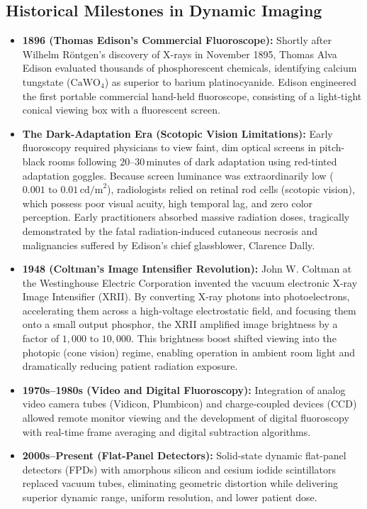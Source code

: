 \documentclass[11pt,a4paper]{article}
\begin{document}
\subsection{Historical Milestones in Dynamic Imaging}

\begin{itemize}[leftmargin=*]
    \item \textbf{1896 (Thomas Edison's Commercial Fluoroscope):} Shortly after Wilhelm Röntgen's discovery of X-rays in November 1895, Thomas Alva Edison evaluated thousands of phosphorescent chemicals, identifying calcium tungstate ($\text{CaWO}_4$) as superior to barium platinocyanide. Edison engineered the first portable commercial hand-held fluoroscope, consisting of a light-tight conical viewing box with a fluorescent screen.
    \item \textbf{The Dark-Adaptation Era (Scotopic Vision Limitations):} Early fluoroscopy required physicians to view faint, dim optical screens in pitch-black rooms following $20\text{--}30\,\text{minutes}$ of dark adaptation using red-tinted adaptation goggles. Because screen luminance was extraordinarily low ($0.001\text{ to }0.01\,\text{cd/m}^2$), radiologists relied on retinal rod cells (scotopic vision), which possess poor visual acuity, high temporal lag, and zero color perception. Early practitioners absorbed massive radiation doses, tragically demonstrated by the fatal radiation-induced cutaneous necrosis and malignancies suffered by Edison's chief glassblower, Clarence Dally.
    \item \textbf{1948 (Coltman's Image Intensifier Revolution):} John W. Coltman at the Westinghouse Electric Corporation invented the vacuum electronic X-ray Image Intensifier (XRII). By converting X-ray photons into photoelectrons, accelerating them across a high-voltage electrostatic field, and focusing them onto a small output phosphor, the XRII amplified image brightness by a factor of $1,000\text{ to }10,000$. This brightness boost shifted viewing into the photopic (cone vision) regime, enabling operation in ambient room light and dramatically reducing patient radiation exposure.
    \item \textbf{1970s--1980s (Video and Digital Fluoroscopy):} Integration of analog video camera tubes (Vidicon, Plumbicon) and charge-coupled devices (CCD) allowed remote monitor viewing and the development of digital fluoroscopy with real-time frame averaging and digital subtraction algorithms.
    \item \textbf{2000s--Present (Flat-Panel Detectors):} Solid-state dynamic flat-panel detectors (FPDs) with amorphous silicon and cesium iodide scintillators replaced vacuum tubes, eliminating geometric distortion while delivering superior dynamic range, uniform resolution, and lower patient dose.
\end{itemize}
\end{document}
